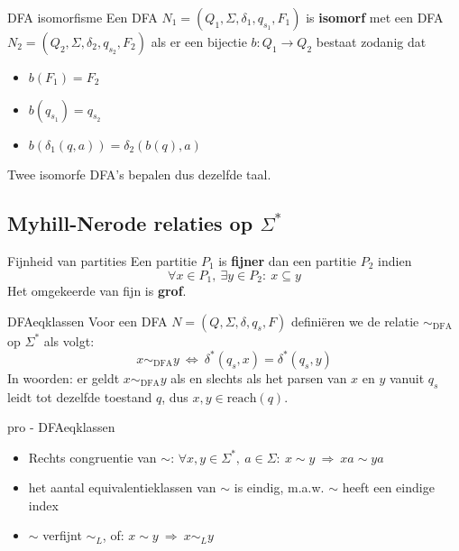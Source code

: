 \begin{theo}{DFA isomorfisme}
    Een DFA $N_1 = (Q_1, \Sigma, \delta_1, q_{s_1}, F_1)$ is \textbf{isomorf} met een DFA $N_2 = (Q_2, \Sigma, \delta_2, q_{s_2}, F_2)$ als er een bijectie $b: Q_1 \to Q_2$ bestaat zodanig dat
    \begin{itemize}
        \item $b(F_1) = F_2$
        \item $b(q_{s_1}) = q_{s_2}$
        \item $b(\delta_1(q,a)) = \delta_2(b(q),a)$
    \end{itemize}
    Twee isomorfe DFA's bepalen dus dezelfde taal.
\end{theo}

\subsection{Myhill-Nerode relaties op $\Sigma^*$}

\vspace{0.5cm}

\begin{theo}{Fijnheid van partities}
    Een partitie $P_1$ is \textbf{fijner} dan een partitie $P_2$ indien
    \begin{equation*}
        \forall x \in P_1,\ \exists y \in P_2: \ x \subseteq y
    \end{equation*}
    Het omgekeerde van fijn is \textbf{grof}.
\end{theo}

\newpage

\begin{theo}{DFAeqklassen}
    Voor een DFA $N = (Q, \Sigma, \delta, q_s, F)$ definiëren we de relatie $\sim_{\text{DFA}}$ op $\Sigma^*$ als volgt:
    \begin{equation*}
        x \sim_{\text{DFA}} y \ \Leftrightarrow \ \delta^*(q_s,x) = \delta^*(q_s,y)
    \end{equation*}
    In woorden: er geldt $x \sim_{\text{DFA}} y$ als en slechts als het parsen van $x$ en $y$ vanuit $q_s$ leidt tot dezelfde toestand $q$, dus $x,y \in \text{reach}(q)$.
\end{theo}

\begin{pro}{pro - DFAeqklassen}
    \begin{itemize}
        \item Rechts congruentie van $\sim$: $\forall x,y \in \Sigma^*, \ a \in \Sigma: \ x \sim y \ \Rightarrow \ xa \sim ya $
        \item het aantal equivalentieklassen van $\sim$ is eindig, m$.$a$.$w$.$ $\sim$ heeft een eindige index
        \item $\sim$ verfijnt $\sim_L$, of: $x \sim y \ \Rightarrow \ x \sim_L y$
    \end{itemize}
\end{pro}

